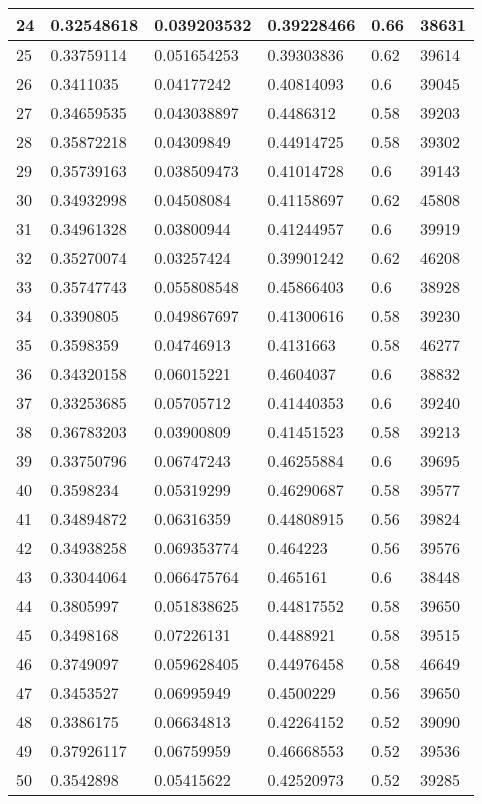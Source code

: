 \begin{longtable}{|l|l|l|l|l|l|}
24 & 0.32548618 & 0.039203532 & 0.39228466 & 0.66 & 38631 \\ \hline 
25 & 0.33759114 & 0.051654253 & 0.39303836 & 0.62 & 39614 \\ \hline 
26 & 0.3411035 & 0.04177242 & 0.40814093 & 0.6 & 39045 \\ \hline 
27 & 0.34659535 & 0.043038897 & 0.4486312 & 0.58 & 39203 \\ \hline 
28 & 0.35872218 & 0.04309849 & 0.44914725 & 0.58 & 39302 \\ \hline 
29 & 0.35739163 & 0.038509473 & 0.41014728 & 0.6 & 39143 \\ \hline 
30 & 0.34932998 & 0.04508084 & 0.41158697 & 0.62 & 45808 \\ \hline 
31 & 0.34961328 & 0.03800944 & 0.41244957 & 0.6 & 39919 \\ \hline 
32 & 0.35270074 & 0.03257424 & 0.39901242 & 0.62 & 46208 \\ \hline 
33 & 0.35747743 & 0.055808548 & 0.45866403 & 0.6 & 38928 \\ \hline 
34 & 0.3390805 & 0.049867697 & 0.41300616 & 0.58 & 39230 \\ \hline 
35 & 0.3598359 & 0.04746913 & 0.4131663 & 0.58 & 46277 \\ \hline 
36 & 0.34320158 & 0.06015221 & 0.4604037 & 0.6 & 38832 \\ \hline 
37 & 0.33253685 & 0.05705712 & 0.41440353 & 0.6 & 39240 \\ \hline 
38 & 0.36783203 & 0.03900809 & 0.41451523 & 0.58 & 39213 \\ \hline 
39 & 0.33750796 & 0.06747243 & 0.46255884 & 0.6 & 39695 \\ \hline 
40 & 0.3598234 & 0.05319299 & 0.46290687 & 0.58 & 39577 \\ \hline 
41 & 0.34894872 & 0.06316359 & 0.44808915 & 0.56 & 39824 \\ \hline 
42 & 0.34938258 & 0.069353774 & 0.464223 & 0.56 & 39576 \\ \hline 
43 & 0.33044064 & 0.066475764 & 0.465161 & 0.6 & 38448 \\ \hline 
44 & 0.3805997 & 0.051838625 & 0.44817552 & 0.58 & 39650 \\ \hline 
45 & 0.3498168 & 0.07226131 & 0.4488921 & 0.58 & 39515 \\ \hline 
46 & 0.3749097 & 0.059628405 & 0.44976458 & 0.58 & 46649 \\ \hline 
47 & 0.3453527 & 0.06995949 & 0.4500229 & 0.56 & 39650 \\ \hline 
48 & 0.3386175 & 0.06634813 & 0.42264152 & 0.52 & 39090 \\ \hline 
49 & 0.37926117 & 0.06759959 & 0.46668553 & 0.52 & 39536 \\ \hline 
50 & 0.3542898 & 0.05415622 & 0.42520973 & 0.52 & 39285 \\ \hline 
\end{longtable}